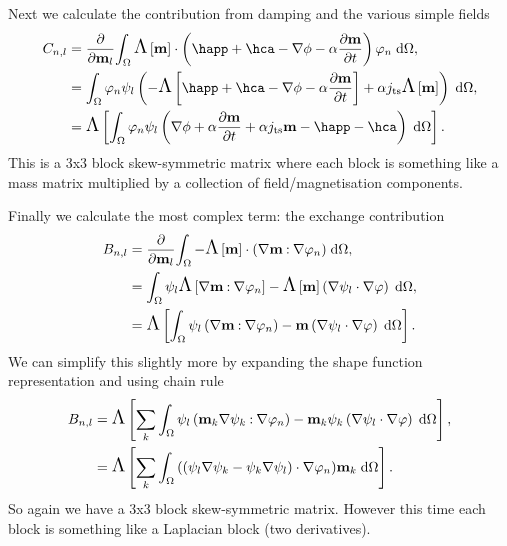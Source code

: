 Next we calculate the contribution from damping and the various simple fields
\begin{equation}
  \begin{aligned} 
    C_{n,l} &= \pd{}{\mv_l} \intd{  \skewm{\mv} \cdot
      \left( \happ + \hca - \nabla \phi - \dampc \dmdt
      \right) \tbf_n}, \\
    &= \intd{ \tbf_n \sbf_l \left( -\skewm{\happ + \hca - \nabla \phi - \dampc \dmdt}
       + \dampc \jts \skewm{\mv}\right)}, \\
    &= \skewm{\intd{ \tbf_n  \sbf_l \left( \nabla \phi + \dampc \dmdt
          + \dampc \jts \mv - \happ - \hca \right) }}.
  \end{aligned}
\end{equation}
This is a 3x3 block skew-symmetric matrix where each block is something like a mass matrix multiplied by a collection of field/magnetisation components.

Finally we calculate the most complex term: the exchange contribution
\begin{equation}
  \begin{aligned}
    B_{n,l} &=  \frac{\partial }{\partial \mathbf{m}_l} {\int_{\Omega} - \text{\Large{$\Lambda$}}\left[ \mathbf{m} \right] \cdot (\nabla \mathbf{m} \mathbin{:} \nabla \varphi_n) {\; \text{d}} {\Omega}} ,\\
    &= {\int_{\Omega}  \psi_l \text{\Large{$\Lambda$}}\left[ \nabla \mathbf{m} \mathbin{:} \nabla \varphi_n \right]
       - \text{\Large{$\Lambda$}}\left[ \mathbf{m} \right] \left( \nabla \psi_l \cdot \nabla \varphi \right) {\; \text{d}} {\Omega}}, \\
     &= \text{\Large{$\Lambda$}}\left[  {\int_{\Omega}  \psi_l \left( \nabla \mathbf{m} \mathbin{:} \nabla \varphi_n \right)
         - \mathbf{m} \left( \nabla \psi_l \cdot \nabla \varphi \right) {\; \text{d}} {\Omega}} \right].
   \end{aligned}
 \end{equation}
We can simplify this slightly more by expanding the shape function representation and using chain rule
\begin{equation}
  \begin{aligned}
    B_{n,l} &= \text{\Large{$\Lambda$}}\left[  \sum_k {\int_{\Omega}  \psi_l \left( \mathbf{m}_k \nabla \psi_k \mathbin{:} \nabla \varphi_n \right)
        - \mathbf{m}_k \psi_k \left( \nabla \psi_l \cdot \nabla \varphi \right) {\; \text{d}} {\Omega}} \right], \\
    &= \text{\Large{$\Lambda$}}\left[  \sum_k {\int_{\Omega}  {\left( (\psi_l \nabla \psi_k - \psi_k \nabla \psi_l)
        \cdot \nabla \varphi_n \right)}  \mathbf{m}_k  {\; \text{d}} {\Omega}} \right]. \\
  \end{aligned}
\end{equation} 
So again we have a 3x3 block skew-symmetric matrix.
However this time each block is something like a Laplacian block (two derivatives).


